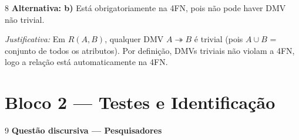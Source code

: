 \documentclass[12pt]{article}
\begin{document}
\vspace{0.5cm}

\begin{gabbox}{8}
\textbf{Alternativa: b)} Está obrigatoriamente na 4FN, pois não pode haver DMV não trivial.

\smallskip
\textit{Justificativa:} Em $R(A, B)$, qualquer DMV $A \twoheadrightarrow B$ é trivial (pois $A \cup B$ = conjunto de todos os atributos). Por definição, DMVs triviais não violam a 4FN, logo a relação está automaticamente na 4FN.
\end{gabbox}

\vspace{0.5cm}

\section*{Bloco 2 — Testes e Identificação}

\begin{gabbox}{9}
\textbf{Questão discursiva — Pesquisadores}
\end{gabbox}
\end{document}
